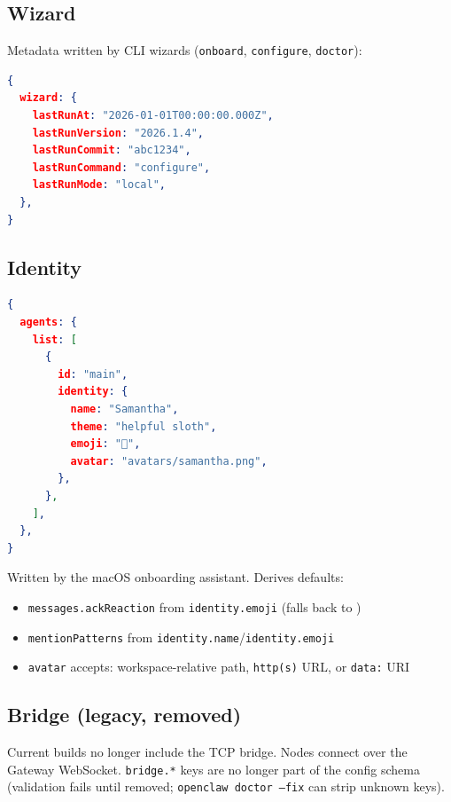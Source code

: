 \hrulefill


\subsection{Wizard}


Metadata written by CLI wizards (\texttt{onboard}, \texttt{configure}, \texttt{doctor}):

\begin{lstlisting}[language=json]
{
  wizard: {
    lastRunAt: "2026-01-01T00:00:00.000Z",
    lastRunVersion: "2026.1.4",
    lastRunCommit: "abc1234",
    lastRunCommand: "configure",
    lastRunMode: "local",
  },
}
\end{lstlisting}


\hrulefill


\subsection{Identity}


\begin{lstlisting}[language=json]
{
  agents: {
    list: [
      {
        id: "main",
        identity: {
          name: "Samantha",
          theme: "helpful sloth",
          emoji: "🦥",
          avatar: "avatars/samantha.png",
        },
      },
    ],
  },
}
\end{lstlisting}


Written by the macOS onboarding assistant. Derives defaults:

\begin{itemize}
  \item \texttt{messages.ackReaction} from \texttt{identity.emoji} (falls back to )
  \item \texttt{mentionPatterns} from \texttt{identity.name}/\texttt{identity.emoji}
  \item \texttt{avatar} accepts: workspace-relative path, \texttt{http(s)} URL, or \texttt{data:} URI
\end{itemize}


\hrulefill


\subsection{Bridge (legacy, removed)}


Current builds no longer include the TCP bridge. Nodes connect over the Gateway WebSocket. \texttt{bridge.*} keys are no longer part of the config schema (validation fails until removed; \texttt{openclaw doctor --fix} can strip unknown keys).


